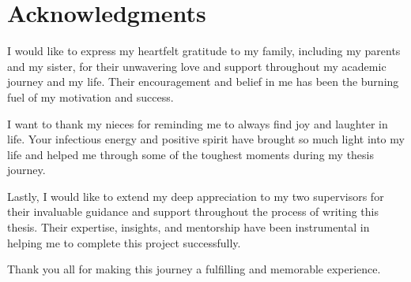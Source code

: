 \chapter*{Acknowledgments}
\thispagestyle{empty}

I would like to express my heartfelt gratitude to my family, including my parents and my sister, for their unwavering love and support throughout my academic journey and my life. Their encouragement and belief in me has been the burning fuel of my motivation and success.

I want to thank my nieces for reminding me to always find joy and laughter in life. Your infectious energy and positive spirit have brought so much light into my life and helped me through some of the toughest moments during my thesis journey.

Lastly, I would like to extend my deep appreciation to my two supervisors for their invaluable guidance and support throughout the process of writing this thesis. Their expertise, insights, and mentorship have been instrumental in helping me to complete this project successfully.

\begin{center}
Thank you all for making this journey a fulfilling and memorable experience.
\end{center}

\clearpage